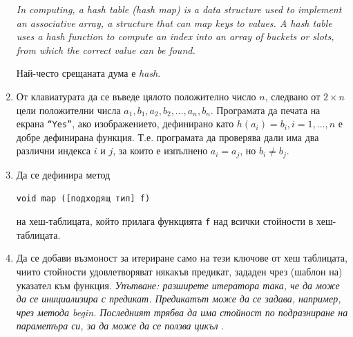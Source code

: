 \begin{enumerate}
    \textit{In computing, a hash table (hash map) is a data structure used to implement an associative array, a structure that can map keys to values. A hash table uses a hash function to compute an index into an array of buckets or slots, from which the correct value can be found.}
  
    Най-често срещаната дума е \textit{hash}.
  
    \item От клавиатурата да се въведе цялото положително число $n$, следвано от $2 \times n$ цели положителни числа $a_1, b_1, a_2, b_2, ..., a_n, b_n$. Програмата да печата на екрана \texttt{``Yes''}, ако изображението, дефинирано като $h(a_i)=b_i,i=1,...,n$ е добре дефинирана функция. Т.е. програмата да проверява дали има два различни индекса $i$ и $j$, за които е изпълнено $a_i=a_j$, но $b_i \neq b_j$.
  
    \item Да се дефинира метод
  
    \texttt{void map ([подходящ тип] f)}
  
    на хеш-таблицата, който прилага функцията \texttt{f} над всички стойности в хеш-таблицата.
  
    \item Да се добави възмоност за итериране само на тези ключове от хеш таблицата, чиито стойности удовлетворяват някакъв предикат, зададен чрез (шаблон на) указател към функция. \emph{Упътване: разширете итератора така, че да може да се инициализира с предикат. Предикатът може да се задава, например, чрез метода begin. Последният трябва да има стойност по подразниране на параметъра си, за да може да се ползва цикъл }.
  
  \end{enumerate}